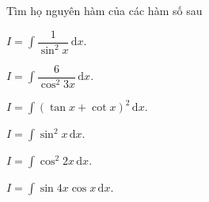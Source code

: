 \begin{vd} %
    Tìm họ nguyên hàm của các hàm số sau
    \begin{listEX}[3]
        \item $I=\displaystyle\int \dfrac{1}{\sin ^2x} \mathrm{\,d}x$.
        \item $I=\displaystyle\int \dfrac{6}{\cos ^2 3x} \mathrm{\,d}x$.
        \item $I=\displaystyle\int (\tan x+\cot x)^2 \mathrm{\,d}x$.
        \item $I=\displaystyle\int \sin ^2x \mathrm{\,d}x$.
        \item $I=\displaystyle\int \cos ^2 2x \mathrm{\,d}x$.
        \item $I=\displaystyle\int \sin 4x \cos x \mathrm{\,d}x$.
    \end{listEX}

\end{vd}
